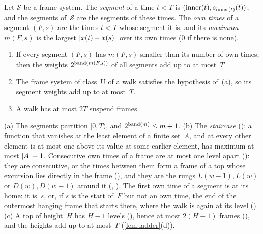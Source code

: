 \begin{lemma}\label{lem:W1}
Let $\mathcal S$ be a frame system. The \emph{segment} of a time $t<T$ is $(\operatorname{inner}(t),s_{\operatorname{inner}(t)}(t))$, and the segments
of~$\mathcal S$ are the segments of these times. The \emph{own times} of a segment $(F,s)$ are the times $t<T$ whose segment it
is, and its \emph{maximum} $m(F,s)$ is the largest $\lvert x(t)-x(s) \rvert$ over its own times ($0$ if there is none).
\begin{enumerate}[label=(\alph*)]
\item If every segment $(F,s)$ has $m(F,s)$ smaller than its number of own times, then the weights $2^{\operatorname{band}(m(F,s))}$ of all
segments add up to at most~$T$.
\item The frame system of class~U of a walk satisfies the hypothesis of~(a), so its segment weights add up to at most~$T$.
\item A walk has at most $2T$ suspend frames.
\end{enumerate}
\end{lemma}

\begin{outline}
(a) The segments partition $[0,T)$, and $2^{\operatorname{band}(m)}\le m+1$. (b) The \emph{staircase} (): a function
that vanishes at the least element of a finite set~$A$, and at every other element is at most one above its value at some
earlier element, has maximum at most $\lvert A \rvert-1$. Consecutive own times of a frame are at most one level apart
(): they are consecutive, or the times between them form a frame of a top whose excursion lies directly in the
frame (), and they are the rungs $L(w-1),L(w)$ or $D(w),D(w-1)$ around it (,
). The first own time of a segment is at its home: it is~$s$, or, if $s$ is the start of~$F$ but not an own
time, the end of the outermost hanging frame that starts there, where the walk is again at its level ().
(c) A top of height~$H$ has $H-1$ levels (), hence at most $2(H-1)$ frames (), and the
heights add up to at most~$T$ (\cref{lem:ladder}(d)).
\end{outline}

